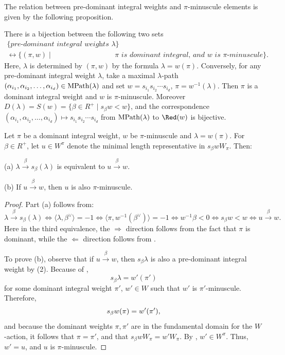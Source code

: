 The relation between pre-dominant integral weights and $\pi$-minuscule elements is given by the following proposition.
\begin{prop}\label{prop:pre-dom}
	There is a bijection between the following two sets
	\begin{align*}
		\{\textit{pre-dominant integral weights } \lambda\}&\\
		\longleftrightarrow  \{(\pi, w)\mid & \pi \textit{ is dominant integral, and }w \textit{ is } \pi \textit{-minuscule}\}.
	\end{align*}
	Here, $\lambda$ is determined by $(\pi,w)$ by the formula $\lambda=w(\pi)$.
	Conversely, for any pre-dominant integral weight $\lambda$,
	take a maximal $\lambda$-path 
	$(\alpha_{i_1},\alpha_{i_2},\ldots,\alpha_{i_d})\in {\rm MPath}(\lambda)$ and
	set $w=s_{i_1} s_{i_2}\cdots s_{i_d}$, $\pi=w^{-1}(\lambda)$.
	Then $\pi$ is a dominant integral weight and $w$ is $\pi$-minuscule.
	Moreover $D(\lambda)= S(w)=\{\beta\in R^{+}\mid s_\beta w<w\}$, and the correspondence $(\alpha_{i_1},\alpha_{i_2},\ldots,\alpha_{i_d})\mapsto s_{i_1} s_{i_2}\cdots s_{i_d}$ from ${\rm MPath}(\lambda)$ to $\Red(w)$ is bijective.
\end{prop}

\begin{corol}\label{lem:wminuscule}
	Let $\pi$ be a dominant integral weight, $w$ be $\pi$-minuscule and \mbox{$\lambda=w(\pi)$}. For $\beta\in R^+$, let $u\in W^\pi$ denote the minimal length representative in $s_\beta wW_\pi$. Then: 
	
	(a) $\lambda\overset{\beta}{\to} s_\beta(\lambda)$ is equivalent to $u \overset{\beta}{\to} w$.
	
	(b) If $u \overset{\beta}{\to} w$, then $u$ is also $\pi$-minuscule.
\end{corol}
\begin{proof} Part (a) follows from:
	{\small \[\lambda\overset{\beta}{\to} s_\beta(\lambda)\Leftrightarrow \langle\lambda,\beta^\vee\rangle=-1\Leftrightarrow \langle\pi,w^{-1}(\beta^\vee)\rangle=-1 \Leftrightarrow w^{-1}\beta<0\Leftrightarrow  s_\beta w<w\Leftrightarrow u\overset{\beta}{\to} w.\]}Here in the third equivalence, the $\Rightarrow$ direction follows from the fact that $\pi$ is dominant, while the $\Leftarrow$ direction follows from . 
	
	To prove (b), observe that if $u\overset{\beta}{\to} w$, then $s_\beta\lambda$ is also a pre-dominant integral weight by (2). Because of ,
	\[s_\beta\lambda=w'(\pi')\]
	for some dominant integral weight $\pi'$, $w'\in W$ such that $w'$ is $\pi'$-minuscule. Therefore,
	\[s_\beta w(\pi)=w'(\pi') \/,\]
	and because the dominant 
	weights $\pi, \pi'$ are in the fundamental 
	domain for the $W$-action, it follows that $\pi=\pi'$, and that $s_\beta wW_\pi=w'W_\pi$. By , $w'\in W^\pi$. Thus, $w'=u$, and $u$ is $\pi$-minuscule.
\end{proof}

